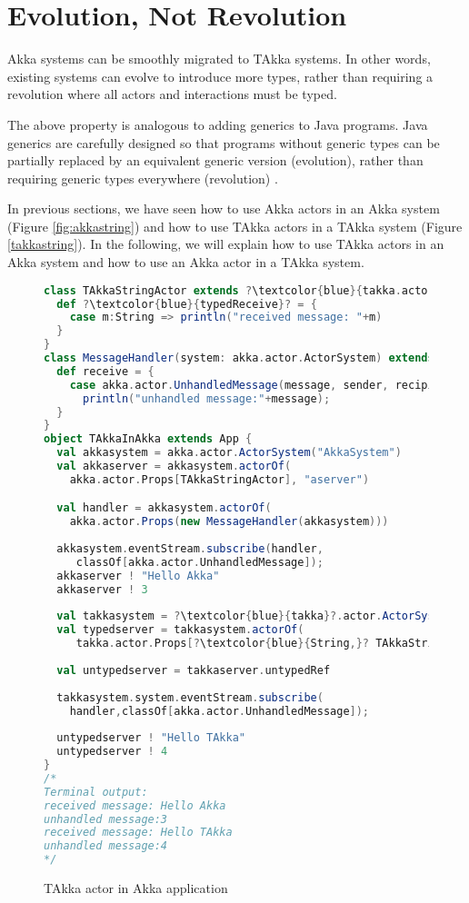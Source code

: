 \section{Evolution, Not Revolution }
\label{evolution}

Akka systems can be smoothly migrated to TAkka systems. In other words, 
existing systems can evolve to introduce more types, rather than requiring a 
revolution where all actors and interactions must be typed.

The above property is analogous to adding generics to Java programs.  Java 
generics are carefully designed so that programs without generic types can be 
partially replaced by an equivalent generic version (evolution), rather than 
requiring generic types everywhere (revolution) \citep{JGC}.

In previous sections, we have seen how to use Akka actors in an Akka 
system (Figure \ref{fig:akkastring}) and how to use TAkka actors in a TAkka 
system (Figure \ref{takkastring}).  In the following, we will explain how to 
use TAkka actors in an Akka system and how to use an Akka actor in a TAkka 
system.

\begin{figure}[!h]

      \begin{lstlisting}[language=scala, escapechar=?]
class TAkkaStringActor extends ?\textcolor{blue}{takka.actor.TypedActor[String]}? {
  def ?\textcolor{blue}{typedReceive}? = {
    case m:String => println("received message: "+m)
  }
}
class MessageHandler(system: akka.actor.ActorSystem) extends akka.actor.Actor {
  def receive = {
    case akka.actor.UnhandledMessage(message, sender, recipient) =>
      println("unhandled message:"+message);
  }
}
object TAkkaInAkka extends App {
  val akkasystem = akka.actor.ActorSystem("AkkaSystem")
  val akkaserver = akkasystem.actorOf(
    akka.actor.Props[TAkkaStringActor], "aserver")

  val handler = akkasystem.actorOf(
    akka.actor.Props(new MessageHandler(akkasystem)))
  
  akkasystem.eventStream.subscribe(handler,
     classOf[akka.actor.UnhandledMessage]);
  akkaserver ! "Hello Akka"
  akkaserver ! 3
  
  val takkasystem = ?\textcolor{blue}{takka}?.actor.ActorSystem("TAkkaSystem")
  val typedserver = takkasystem.actorOf(
     takka.actor.Props[?\textcolor{blue}{String,}? TAkkaStringActor], "tserver")
  
  val untypedserver = takkaserver.untypedRef
  
  takkasystem.system.eventStream.subscribe(
    handler,classOf[akka.actor.UnhandledMessage]);
  
  untypedserver ! "Hello TAkka"
  untypedserver ! 4
}
/*
Terminal output:
received message: Hello Akka
unhandled message:3
received message: Hello TAkka
unhandled message:4
*/
    \end{lstlisting}
    \caption{TAkka actor in Akka application}
\label{takkaINakka}    
\end{figure}

